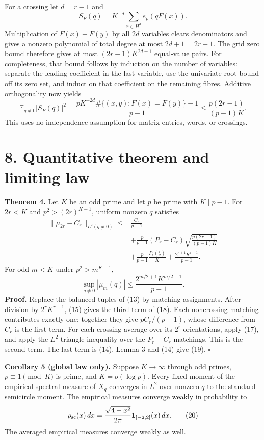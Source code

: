 \documentclass[
  11pt,
]{article}
\begin{document}
For a crossing let \(d=r-1\) and \[
 S_F(q)=K^{-d}\sum_{x\in H^d}e_p(qF(x)).
\] Multiplication of \(F(x)-F(y)\) by all \(2d\) variables clears
denominators and gives a nonzero polynomial of total degree at most
\(2d+1=2r-1\). The grid zero bound therefore gives at most
\((2r-1)K^{2d-1}\) equal-value pairs. For completeness, that bound
follows by induction on the number of variables: separate the leading
coefficient in the last variable, use the univariate root bound off its
zero set, and induct on that coefficient on the remaining fibres.
Additive orthogonality now yields \[
 \mathbb E_{q\ne0}|S_F(q)|^2
 =\frac{pK^{-2d}\#\{(x,y):F(x)=F(y)\}-1}{p-1}
 \leq\frac{p(2r-1)}{(p-1)K}. \tag{17}
\] This uses no independence assumption for matrix entries, words, or
crossings.

\hypertarget{quantitative-theorem-and-limiting-law}{%
\section{8. Quantitative theorem and limiting
law}\label{quantitative-theorem-and-limiting-law}}

\textbf{Theorem 4.} Let \(K\) be an odd prime and let \(p\) be prime
with \(K\mid p-1\). For \(2r<K\) and \(p^2>(2r)^{K-1}\), uniform nonzero
\(q\) satisfies \[
\begin{aligned}
 \|\mu_{2r}-C_r\|_{L^2(q\ne0)}\leq{}&\frac{C_r}{p-1}\\
 &+\frac p{p-1}(P_r-C_r)
       \sqrt{\frac{p(2r-1)}{(p-1)K}}\\
 &+\frac p{p-1}\frac{P_r\binom r2}{K}
       +\frac{2^{r+1}K^{r+1}}{p-1}.
\end{aligned} \tag{18}
\] For odd \(m<K\) under \(p^2>m^{K-1}\), \[
 \sup_{q\ne0}|\mu_m(q)|\leq
       \frac{2^{m/2+1}K^{m/2+1}}{p-1}. \tag{19}
\] \textbf{Proof.} Replace the balanced tuples of (13) by matching
assignments. After division by \(2^rK^{r-1}\), (15) gives the third term
of (18). Each noncrossing matching contributes exactly one; together
they give \(pC_r/(p-1)\), whose difference from \(C_r\) is the first
term. For each crossing average over its \(2^r\) orientations, apply
(17), and apply the \(L^2\) triangle inequality over the \(P_r-C_r\)
matchings. This is the second term. The last term is (14). Lemma 3 and
(14) give (19). \(\square\)

\textbf{Corollary 5 (global law only).} Suppose \(K\to\infty\) through
odd primes, \(p\equiv1\pmod K\) is prime, and \(K=o(\log p)\). Every
fixed moment of the empirical spectral measure of \(X_q\) converges in
\(L^2\) over nonzero \(q\) to the standard semicircle moment. The
empirical measures converge weakly in probability to \[
 \rho_{\rm sc}(x)\,dx=\frac{\sqrt{4-x^2}}{2\pi}
       \mathbf1_{[-2,2]}(x)\,dx. \tag{20}
\] The averaged empirical measures converge weakly as well.
\end{document}
